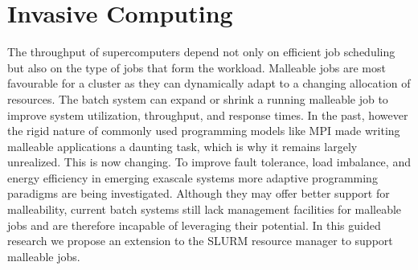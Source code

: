 \documentclass[a4paper, 12pt]{article}
\begin{document}
\section{Invasive Computing}
The throughput of supercomputers depend not only on efficient job scheduling but also on the type of jobs that form the workload. Malleable jobs are most favourable for a cluster as they can dynamically adapt to a changing allocation of resources. The batch system can expand or shrink a running malleable job to improve system utilization, throughput, and response times. In the past, however the rigid nature of commonly used programming models like MPI made writing malleable applications a daunting task, which is why it remains largely unrealized. This is now changing. To improve fault tolerance, load imbalance, and energy efficiency in emerging exascale systems more adaptive programming paradigms are being investigated. Although they may offer better support for malleability, current batch systems still lack management facilities for malleable jobs and are therefore incapable of leveraging their potential. In this guided research we propose an extension to the SLURM resource manager to support malleable jobs.
\end{document}
